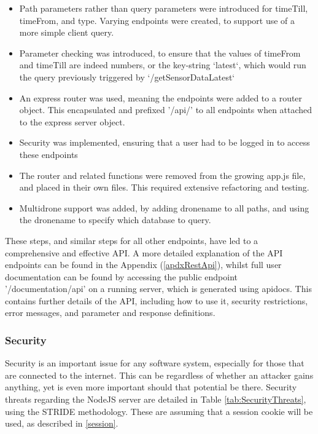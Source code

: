 \documentclass{article}
\begin{document}
\begin{itemize}
	\item Path parameters rather than query parameters were introduced for timeTill, timeFrom, and type. Varying endpoints were created, to support use of a more simple client query. 
	\item Parameter checking was introduced, to ensure that the values of timeFrom and timeTill are indeed numbers, or the key-string `latest`, which would run the query previously triggered by `/getSensorDataLatest`
	\item An express router was used, meaning the endpoints were added to a router object. This encapsulated and prefixed '/api/' to all endpoints when attached to the express server object. 
	\item Security was implemented, ensuring that a user had to be logged in to access these endpoints
	\item The router and related functions were removed from the growing app.js file, and placed in their own files. This required extensive refactoring and testing.
	\item Multidrone support was added, by adding dronename to all paths, and using the dronename to specify which database to query.
\end{itemize}

These steps, and similar steps for all other endpoints, have led to a comprehensive and effective API. A more detailed explanation of the API endpoints can be found in the Appendix (\ref{apdxRestApi}), whilst full user documentation can be found by accessing the public endpoint '/documentation/api' on a running server, which is generated using apidocs\cite{apidocs}. This contains further details of the API, including how to use it, security restrictions, error messages, and parameter and response definitions.

\subsubsection{Security}
Security is an important issue for any software system, especially for those that are connected to the internet. This can be regardless of whether an attacker gains anything, yet is even more important should that potential be there. Security threats regarding the NodeJS server are detailed in Table \ref{tab:SecurityThreats}, using the STRIDE methodology\cite{stride}. These are assuming that a session cookie will be used, as described in \ref{session}.
\end{document}
